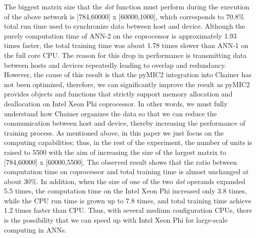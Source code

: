 The biggest matrix size that the \textit{dot} function must perform during the execution of the above network is [784,60000] x [60000,1000], which corresponds to 70.8\% total run time used to synchronize data between host and device. Although the purely computation time of ANN-2 on the coprocessor is approximately 1.93 times faster, the total training time was about 1.78 times slower than ANN-1 on the full core CPU. The reason for this drop in performance is transmitting data between hosts and devices repeatedly leading to overlap and redundancy. However, the cause of this result is that the pyMIC2 integration into Chainer has not been optimized, therefore, we can significantly improve the result as pyMIC2 provides objects and functions that strictly support memory allocation and deallocation on Intel Xeon Phi coprocessor. In other words, we must fully understand how Chainer organizes the data so that we can reduce the communication between host and device, thereby increasing the performance of training process. As mentioned above, in this paper we just focus on the computing capabilities; thus, in the rest of the experiment, the number of units is raised to 5500 with the aim of increasing the size of the largest matrix to [784,60000] x [60000,5500]. The observed result shows that the ratio between computation time on coprocessor and total training time is almost unchanged at about 30\%. In addition, when the size of one of the two \textit{dot} operands expanded 5.5 times, the computation time on the Intel Xeon Phi increased only 3.8 times, while the CPU run time is grown up to 7.8 times, and total training time achieve 1.2 times faster than CPU. Thus, with several medium configuration CPUs, there is the possibility that we can speed up with Intel Xeon Phi for large-scale computing in ANNs.
